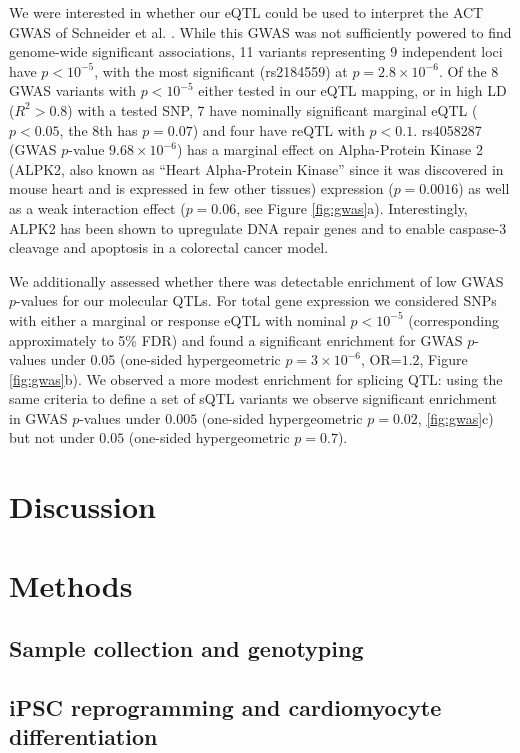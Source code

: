 \documentclass{article}
\begin{document}
{We were interested in whether our eQTL could be used to interpret the ACT GWAS of Schneider et al. \cite{Schneider2016}. While this GWAS was not sufficiently powered to find genome-wide significant associations, 11 variants representing 9 independent loci have $p<10^{-5}$, with the most significant (rs2184559) at $p=2.8 \times 10^{-6}$. Of the 8 GWAS variants with $p<10^{-5}$ either tested in our eQTL mapping, or in high LD ($R^2 > 0.8$) with a tested SNP, 7 have nominally significant marginal eQTL ($p<0.05$, the 8th has $p=0.07$) and four have reQTL with $p<0.1$. rs4058287 (GWAS $p$-value $9.68\times 10^{-6}$) has a marginal effect on Alpha-Protein Kinase 2 (ALPK2, also known as ``Heart Alpha-Protein Kinase'' since it was discovered in mouse heart\cite{ryazanov1999alpha} and is expressed in few other tissues\cite{gtex}) expression ($p=0.0016$) as well as a weak interaction effect ($p=0.06$, see Figure \ref{fig:gwas}a). Interestingly, ALPK2 has been shown to upregulate DNA repair genes and to enable caspase-3 cleavage and apoptosis in a colorectal cancer model\citep{yoshida2012alpk2}. 

We additionally assessed whether there was detectable enrichment of low GWAS $p$-values for our molecular QTLs. For total gene expression we considered SNPs with either a marginal or response eQTL with nominal $p < 10^{-5}$ (corresponding approximately to 5\% FDR) and found a significant enrichment for GWAS $p$-values under $0.05$ (one-sided hypergeometric $p=3 \times 10^{-6}$, OR=$1.2$, Figure \ref{fig:gwas}b). We observed a more modest enrichment for splicing QTL: using the same criteria to define a set of sQTL variants we observe significant enrichment in GWAS $p$-values under $0.005$ (one-sided hypergeometric $p=0.02$, \ref{fig:gwas}c) but not under $0.05$ (one-sided hypergeometric $p=0.7$).  

\section*{Discussion}

\section*{Methods} 

\subsection*{Sample collection and genotyping}

\subsection*{iPSC reprogramming and cardiomyocyte differentiation} 

}
\end{document}
